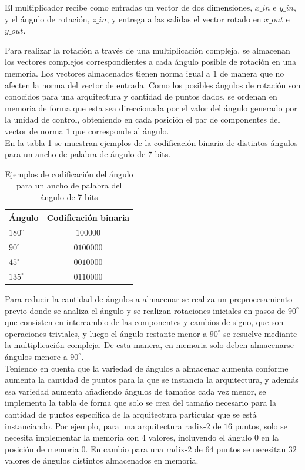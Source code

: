 El multiplicador recibe como entradas un vector de dos dimensiones, $x\_in$ e $y\_in$, y el ángulo
de rotación, $z\_in$, y entrega a las salidas el vector rotado en $x\_out$ e $y\_out$.

Para realizar la rotación a través de una multiplicación compleja, se almacenan los vectores
complejos correspondientes a cada ángulo posible de rotación en una memoria. Los vectores
almacenados tienen norma igual a $1$ de manera que no afecten la norma del vector de entrada.
Como los posibles ángulos de rotación son conocidos para una arquitectura y cantidad de puntos
dados, se ordenan en memoria de forma que esta sea direccionada por el valor del ángulo generado por
la unidad de control, obteniendo en cada posición el par de componentes del vector de norma $1$ que
corresponde al ángulo.\\
En la tabla \ref{table:angbits} se muestran ejemplos de la codificación binaria de
distintos ángulos para un ancho de palabra de ángulo de 7 bits.

\begin{table}[htb!]
\centering
\begin{tabular}{l c}
\textbf{Ángulo} & \textbf{Codificación binaria}\\ \hline 
$180^\circ$ & $100000$ \\
$90^\circ$ &  $0100000$ \\
$45^\circ$ &  $0010000$ \\
$135^\circ$ & $0110000$ \\ \hline
\end{tabular}
\caption{Ejemplos de codificación del ángulo para un ancho de palabra del ángulo de 7 bits}
\label{table:angbits}
\end{table}

Para reducir la cantidad de ángulos a almacenar se realiza un preprocesamiento previo donde se
analiza el ángulo y se realizan rotaciones iniciales en pasos de $90^\circ$ que consisten en intercambio
de las componentes y cambios de signo, que son operaciones triviales, y luego el ángulo restante
menor a $90^\circ$ se resuelve mediante la multiplicación compleja. De esta manera, en memoria solo deben
almacenarse ángulos menore a $90^\circ$.\\
Teniendo en cuenta que la variedad de ángulos a almacenar aumenta conforme aumenta la cantidad de
puntos para la que se instancia la arquitectura, y además esa variedad aumenta añadiendo ángulos de
tamaños cada vez menor, se implementa la tabla de forma que solo se crea del tamaño necesario para
la cantidad de puntos específica de la arquitectura particular que se está instanciando. Por ejemplo, para una arquitectura radix-2 de $16$ puntos, solo se necesita implementar la memoria con $4$
valores, incluyendo el ángulo $0$ en la posición de memoria $0$. En cambio para una radix-2 de $64$
puntos se necesitan $32$ valores de ángulos distintos almacenados en memoria.\\

